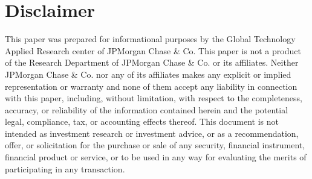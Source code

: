 \documentclass[conference,10pt]{IEEEtran}
\begin{document}
\section*{Disclaimer}
This paper was prepared for informational purposes by the Global Technology Applied Research center of JPMorgan Chase \& Co. This paper is not a product of the Research Department of JPMorgan Chase \& Co. or its affiliates. Neither JPMorgan Chase \& Co. nor any of its affiliates makes any explicit or implied representation or warranty and none of them accept any liability in connection with this paper, including, without limitation, with respect to the completeness, accuracy, or reliability of the information contained herein and the potential legal, compliance, tax, or accounting effects thereof. This document is not intended as investment research or investment advice, or as a recommendation, offer, or solicitation for the purchase or sale of any security, financial instrument, financial product or service, or to be used in any way for evaluating the merits of participating in any transaction.
\end{document}
